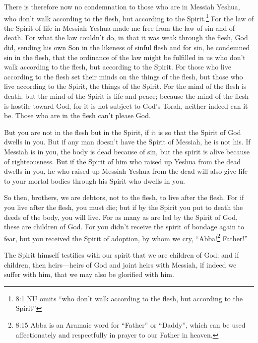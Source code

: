 \mychapter{} \myverse*{}There is therefore now no condemnation to those who are in Messiah
Yeshua, who don’t walk according to the flesh, but according to the Spirit.\footnote{8:1 NU omits “who don’t walk according to the flesh, but according to the Spirit”}
\myverse{}For the law of the Spirit of life in Messiah Yeshua made me free from the law
of sin and of death.
\myverse{}For what the law couldn’t do, in that it was weak through the flesh, God did,
sending his own Son in the likeness of sinful flesh and for sin, he condemned sin in the flesh,
\myverse{}that the ordinance of the law might be fulfilled in us who don’t walk according
to the flesh, but according to the Spirit.
\myverse{}For those who live according to the flesh set their minds on the things of the
flesh, but those who live according to the Spirit, the things of the Spirit.
\myverse{}For the mind of the flesh is death, but the mind of the Spirit is life and peace;
\myverse{}because the mind of the flesh is hostile toward God, for it is not subject to
God’s Torah, neither indeed can it be.
\myverse{}Those who are in the flesh can’t please God.

\myverse{}But you are not in the flesh but in the Spirit, if it is so that
the Spirit of God dwells in you. But if any man doesn’t have the Spirit of Messiah, he is not his.
\myverse{}If Messiah is in you, the body is dead because of sin, but the spirit is alive
because of righteousness.
\myverse{}But if the Spirit of him who raised up Yeshua from the dead dwells in you,
he who raised up Messiah Yeshua from the dead will also give life to your mortal bodies through his Spirit
who dwells in you.

\myverse{}So then, brothers, we are debtors, not to the flesh, to live
after the flesh.
\myverse{}For if you live after the flesh, you must die; but if by the Spirit you put
to death the deeds of the body, you will live.
\myverse{}For as many as are led by the Spirit of God, these are children of God.
\myverse{}For you didn’t receive the spirit of bondage again to fear, but you received
the Spirit of adoption, by whom we cry, “Abba!\footnote{8:15 Abba is an Aramaic word for “Father” or “Daddy”, which can be used affectionately and respectfully
	in prayer to our Father in heaven.} Father!”

\myverse{}The Spirit himself testifies with our spirit that we are children
of God;
\myverse{}and if children, then heirs—heirs of God and joint heirs with Messiah, if
indeed we suffer with him, that we may also be glorified with him.

